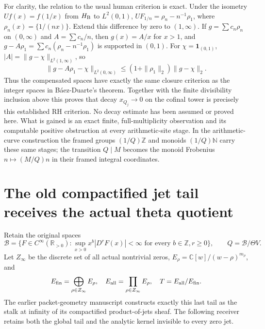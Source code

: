 \documentclass[11pt]{article}
\newcommand{\C}{\mathbb C}\newcommand{\R}{\mathbb R}
\newcommand{\B}{\mathscr B}\newcommand{\M}{\mathcal M}
\begin{document}
For clarity, the relation to the usual human criterion is exact. Under the
isometry $Uf(x)=f(1/x)$ from $H_{\rm B}$ to $L^2(0,1)$,
$UF_{1/n}=\rho_n-n^{-1}\rho_1$, where
$\rho_n(x)=\{1/(nx)\}$. Extend this difference by zero to $(1,\infty)$.
If $g=\sum c_n\rho_n$ on $(0,\infty)$ and $A=\sum c_n/n$, then
$g(x)=A/x$ for $x>1$, and
$g-A\rho_1=\sum c_n(\rho_n-n^{-1}\rho_1)$ is supported in $(0,1)$.
For $\chi=\mathbf1_{(0,1)}$,
$|A|=\|g-\chi\|_{L^2(1,\infty)}$, so
\[
 \|g-A\rho_1-\chi\|_{L^2(0,\infty)}
 \leq (1+\|\rho_1\|_2)\|g-\chi\|_2.
\]
Thus the compensated spaces have exactly the same closure criterion as
the integer spaces in B\'aez-Duarte's theorem. Together with the finite
divisibility inclusion above this proves that decay $x_{Q_j}\to0$ on the
cofinal tower is precisely this established RH criterion. No decay estimate
has been assumed or proved here. What is gained is an exact finite,
full-multiplicity observation and its computable positive obstruction at
every arithmetic-site stage. In the arithmetic-curve construction the
framed groups $(1/Q)\mathbb Z$ and monoids $(1/Q)\mathbb N$ carry these
same stages; the transition $Q\mid M$ becomes the monoid Frobenius
$n\mapsto (M/Q)n$ in their framed integral coordinates.

\section{The old compactified jet tail receives the actual theta quotient}
Retain the original spaces
\[
 \B=\{F\in C^\infty(\R_{>0}):\sup_{x>0}x^b|D^rF(x)|<\infty
                      \text{ for every }b\in\mathbb Z,r\geq0\},
 \qquad Q=\B/\Theta V.
\]
Let $Z_\infty$ be the discrete set of all actual nontrivial zeros,
$E_\rho=\C[w]/(w-\rho)^{m_\rho}$, and
\[
 E_{\rm fin}=\bigoplus_{\rho\in Z_\infty}E_\rho,\quad
 E_{\rm all}=\prod_{\rho\in Z_\infty}E_\rho,\quad
 T=E_{\rm all}/E_{\rm fin}.
\]
The earlier packet-geometry manuscript constructs exactly this last
tail as the stalk at infinity of its compactified product-of-jets sheaf.
The following receiver retains both the global tail and the analytic
kernel invisible to every zero jet.
\end{document}

